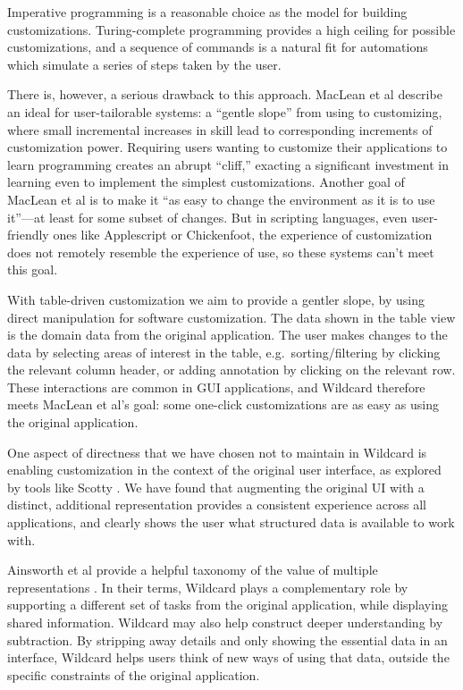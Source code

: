 \documentclass[sigplan,10pt,anonymous,review]{acmart}
\begin{document}
Imperative programming is a reasonable choice as the model for building
customizations. Turing-complete programming provides a high ceiling for
possible customizations, and a sequence of commands is a natural fit for
automations which simulate a series of steps taken by the user.

There is, however, a serious drawback to this approach. MacLean et al
\citep{maclean1990} describe an ideal for user-tailorable systems: a
``gentle slope'' from using to customizing, where small incremental
increases in skill lead to corresponding increments of customization
power. Requiring users wanting to customize their applications to learn
programming creates an abrupt ``cliff,'' exacting a significant
investment in learning even to implement the simplest customizations.
Another goal of MacLean et al is to make it ``as easy to change the
environment as it is to use it''---at least for some subset of changes.
But in scripting languages, even user-friendly ones like Applescript or
Chickenfoot, the experience of customization does not remotely resemble
the experience of use, so these systems can't meet this goal.

With table-driven customization we aim to provide a gentler slope, by
using direct manipulation for software customization. The data shown in
the table view is the domain data from the original application. The
user makes changes to the data by selecting areas of interest in the
table, e.g.~sorting/filtering by clicking the relevant column header, or
adding annotation by clicking on the relevant row. These interactions
are common in GUI applications, and Wildcard therefore meets MacLean et
al's goal: some one-click customizations are as easy as using the
original application.

One aspect of directness that we have chosen not to maintain in Wildcard
is enabling customization in the context of the original user interface,
as explored by tools like Scotty \citep{eagan2011}. We have found that
augmenting the original UI with a distinct, additional representation
provides a consistent experience across all applications, and clearly
shows the user what structured data is available to work with.

Ainsworth et al provide a helpful taxonomy of the value of multiple
representations \citep{ainsworth1999}. In their terms, Wildcard plays a
complementary role by supporting a different set of tasks from the
original application, while displaying shared information. Wildcard may
also help construct deeper understanding by subtraction. By stripping
away details and only showing the essential data in an interface,
Wildcard helps users think of new ways of using that data, outside the
specific constraints of the original application.
\end{document}

